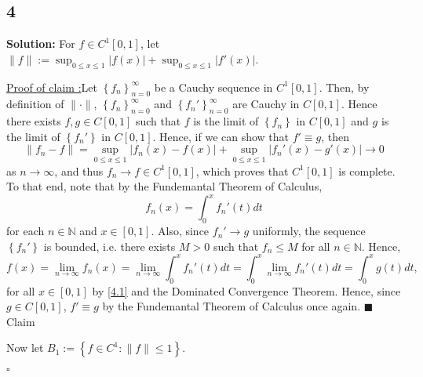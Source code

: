 \documentclass[12pt]{article}
\newcounter{ProofCounter}
\newcounter{ClaimCounter}[ProofCounter]
\newenvironment{Solution}{\stepcounter{ProofCounter}\textbf{Solution:}}{\hfill$\square$}
\newenvironment{claim}[1]{\vspace{1mm}\stepcounter{ClaimCounter}\par\noindent\underline{\bf Claim \theClaimCounter:}\space#1}{}
\newenvironment{claimproof}[1]{\par\noindent\underline{Proof of claim \theClaimCounter:}\space#1}{\hfill $\blacksquare$ Claim \theClaimCounter}
\begin{document}
\subsection*{4}
\begin{Solution}
  For $f \in C^{1}[0,1]$, let $\|f\| := \sup_{0\leq x \leq 1}|f(x)| + \sup_{0\leq x\leq 1}|f'(x)|$.

  \begin{claimproof}
    Let $\left\{ f_{n} \right\}_{n=0}^{\infty}$ be a Cauchy sequence in $C^{1}[0,1]$. Then, by definition of $\|\cdot\|$, $\left\{ f_{n}
    \right\}_{n=0}^{\infty}$ and $\left\{ f_{n}' \right\}_{n=0}^{\infty}$ are Cauchy in $C[0,1]$. Hence there exists $f, g \in C[0,1]$ such that $f$
    is the limit of $\left\{ f_n \right\}$ in $C[0,1]$ and $g$ is the limit of $\left\{ f_n' \right\}$ in $C[0,1]$. Hence, if we can show that $f'
    \equiv g$, then 
    \[
      \|f_n - f\| = \sup_{0\leq x\leq 1}|f_n(x) - f(x)| + \sup_{0\leq x \leq 1}|f_n'(x) - g'(x)| \longrightarrow 0
    \]
    as $n\rightarrow \infty$, and thus $f_n \rightarrow f \in C^{1}[0,1]$, which proves that $C^{1}[0,1]$ is complete. To that end, note that by the
    Fundemantal Theorem of Calculus,
    \begin{equation}
      f_{n}(x) = \int_{0}^{x}f_{n}'(t)dt
      \label{4.1}
    \end{equation}
    for each $n \in \mathbb{N}$ and $x \in [0,1]$. Also, since $f_{n}' \rightarrow g$ uniformly, the sequence $\left\{ f_n' \right\}$ is bounded, i.e.
    there exists $M > 0$ such that $f_{n} \leq M$ for all $n \in \mathbb{N}$. Hence,
    \[
      f(x) = \lim_{n\rightarrow\infty} f_{n}(x) = \lim_{n\rightarrow\infty}\int_{0}^{x}f_{n}'(t)dt = \int_{0}^{x} \lim_{n\rightarrow\infty}f_{n}'(t)dt
      = \int_{0}^{x}g(t)dt,
    \]
    for all $x \in [0,1]$ by \eqref{4.1} and the Dominated Convergence Theorem. Hence, since $g \in C[0,1]$, $f' \equiv g$ by the Fundemantal Theorem
    of Calculus once again.
  \end{claimproof}

  Now let $B_1 := \left\{ f \in C^{1} : \|f\| \leq 1 \right\}$.


\end{Solution}
\end{document}
